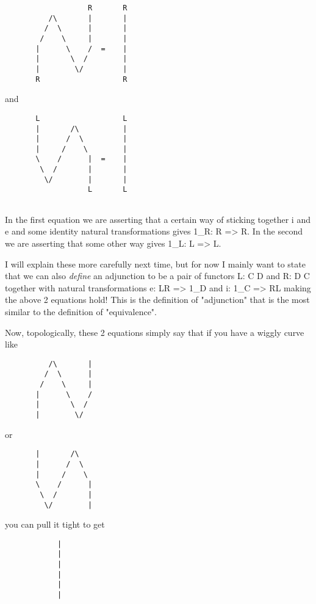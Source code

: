 \begin{verbatim}
                   R       R
          /\       |       |
         /  \      |       |
        /    \     |       |
       |      \    /  =    | 
       |       \  /        |
       |        \/         |
       R                   R

\end{verbatim}
    
and

\begin{verbatim}
       L                   L
       |       /\          |
       |      /  \         |
       |     /    \        |
       \    /      |  =    | 
        \  /       |       |
         \/        |       |
                   L       L
                    
\end{verbatim}
    

In the first equation we are asserting that a certain way of sticking
together i and e and some identity natural transformations gives
1_{R}: R => R.  In the second we are asserting that some
other way gives 1_{L}: L => L.


I will explain these more carefully next time, but for now I mainly want
to state that we can also \emph{define} an adjunction to be a pair of
functors L: C \to  D and R: D \to  C together with natural
transformations e: LR => 1_{D} and i: 1_{C} => RL
making the above 2 equations hold!  This is the definition of
"adjunction" that is the most similar to the definition of
"equivalence".

Now, topologically, these 2 equations simply say that if you have a wiggly
curve like

\begin{verbatim}
          /\       |       
         /  \      |       
        /    \     |       
       |      \    /  
       |       \  /        
       |        \/         

\end{verbatim}
    
or

\begin{verbatim}
       |       /\          
       |      /  \         
       |     /    \        
       \    /      |   
        \  /       |       
         \/        |       

\end{verbatim}
    
you can pull it tight to get

\begin{verbatim}
            |
            |
            |
            |
            |
            |

\end{verbatim}
    
